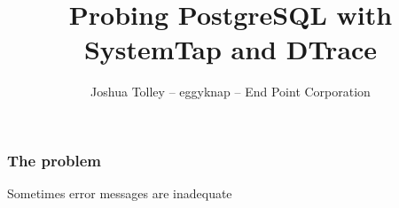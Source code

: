 \documentclass{beamer}
\begin{document}
\title{Probing PostgreSQL with SystemTap and DTrace}
\author{Joshua Tolley -- eggyknap -- End Point Corporation
}


\frame{\titlepage}

\begin{frame}
    \frametitle{The problem}
    Sometimes error messages are inadequate
    \begin{figure}[b]
    \begin{centering}
    \end{centering}
    \end{figure}
\end{frame}
\end{document}
